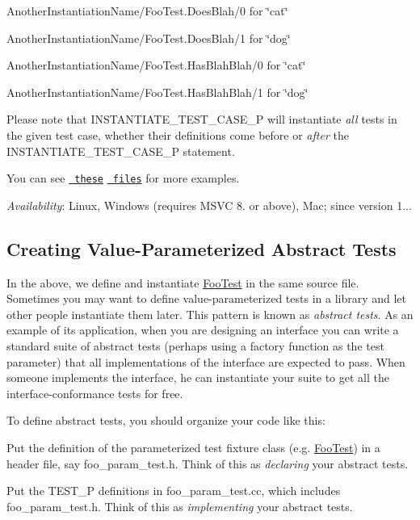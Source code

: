 \begin{DoxyItemize}
\item {\ttfamily Another\+Instantiation\+Name/\+Foo\+Test.\+Does\+Blah/0} for {\ttfamily \char`\"{}cat\char`\"{}}
\item {\ttfamily Another\+Instantiation\+Name/\+Foo\+Test.\+Does\+Blah/1} for {\ttfamily \char`\"{}dog\char`\"{}}
\item {\ttfamily Another\+Instantiation\+Name/\+Foo\+Test.\+Has\+Blah\+Blah/0} for {\ttfamily \char`\"{}cat\char`\"{}}
\item {\ttfamily Another\+Instantiation\+Name/\+Foo\+Test.\+Has\+Blah\+Blah/1} for {\ttfamily \char`\"{}dog\char`\"{}}
\end{DoxyItemize}

Please note that {\ttfamily I\+N\+S\+T\+A\+N\+T\+I\+A\+T\+E\+\_\+\+T\+E\+S\+T\+\_\+\+C\+A\+S\+E\+\_\+P} will instantiate {\itshape all} tests in the given test case, whether their definitions come before or {\itshape after} the {\ttfamily I\+N\+S\+T\+A\+N\+T\+I\+A\+T\+E\+\_\+\+T\+E\+S\+T\+\_\+\+C\+A\+S\+E\+\_\+P} statement.

You can see \href{../samples/sample7_unittest.cc}\texttt{ these} \href{../samples/sample8_unittest.cc}\texttt{ files} for more examples.

{\itshape Availability}\+: Linux, Windows (requires M\+S\+VC 8. or above), Mac; since version 1...

\subsection*{Creating Value-\/\+Parameterized Abstract Tests}

In the above, we define and instantiate {\ttfamily \mbox{\hyperlink{class_foo_test}{Foo\+Test}}} in the same source file. Sometimes you may want to define value-\/parameterized tests in a library and let other people instantiate them later. This pattern is known as {\itshape abstract tests}. As an example of its application, when you are designing an interface you can write a standard suite of abstract tests (perhaps using a factory function as the test parameter) that all implementations of the interface are expected to pass. When someone implements the interface, he can instantiate your suite to get all the interface-\/conformance tests for free.

To define abstract tests, you should organize your code like this\+:


\begin{DoxyEnumerate}
\item Put the definition of the parameterized test fixture class (e.\+g. {\ttfamily \mbox{\hyperlink{class_foo_test}{Foo\+Test}}}) in a header file, say {\ttfamily foo\+\_\+param\+\_\+test.\+h}. Think of this as {\itshape declaring} your abstract tests.
\end{DoxyEnumerate}
\begin{DoxyEnumerate}
\item Put the {\ttfamily T\+E\+S\+T\+\_\+P} definitions in {\ttfamily foo\+\_\+param\+\_\+test.\+cc}, which includes {\ttfamily foo\+\_\+param\+\_\+test.\+h}. Think of this as {\itshape implementing} your abstract tests.
\end{DoxyEnumerate}

